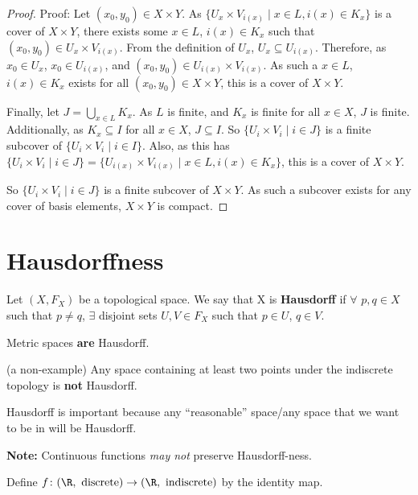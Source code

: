 \begin{proof}
Proof: Let $(x_0,y_0) \in X \times Y$.  As $\{U_x \times V_{i(x)} \mid x \in L, i(x) \in K_x\}$ is a cover of $X \times Y$, there exists some $x \in L$, $i(x) \in K_x$ such that $(x_0,y_0) \in U_x \times V_{i(x)}$.  From the definition of $U_x$, $U_x \subseteq U_{i(x)}$.  Therefore, as $x_0 \in U_x$, $x_0 \in U_{i(x)}$, and $(x_0, y_0) \in U_{i(x)} \times V_{i(x)}$.  As such a $x \in L$, $i(x) \in K_x$ exists for all $(x_0, y_0) \in X \times Y$, this is a cover of $X \times Y$.  

Finally, let $J = \bigcup_{x \in L} K_x$.  As $L$ is finite, and $K_x$ is finite for all $x \in X$, $J$ is finite.  Additionally, as $K_x \subseteq I$ for all $x \in X$, $J \subseteq I$.  So $\{U_i \times V_i \mid i \in J\}$ is a finite subcover of $\{U_i \times V_i \mid i \in I\}$.  Also, as this has $\{U_i \times V_i \mid i \in J\} = \{U_{i(x)} \times V_{i(x)} \mid x \in L, i(x) \in K_x\}$, this is a cover of $X \times Y$.

So $\{U_i \times V_i \mid i \in J\}$ is a finite subcover of $X \times Y$.  As such a subcover exists for any cover of basis elements, $X \times Y$ is compact.
\end{proof}


\section{Hausdorffness}

\begin{definition}
    Let $(X, F _X)$ be a topological space. We say that X is {\bf Hausdorff} if $\forall$ $p, q \in X$ such that $p \neq q$, $\exists$ disjoint sets $U, V \in F_X$ such that $p \in U$, $q \in V$.
\end{definition}

\begin{example}
    Metric spaces \textbf{are} Hausdorff.
\end{example}
\begin{example} (a non-example)
    Any space containing at least two points under the indiscrete topology is \textbf{not} Hausdorff.
\end{example}
    
Hausdorff is important because any ``reasonable'' space/any space that we want to be in will be Hausdorff.
    
    \textbf{Note:} Continuous functions \emph{may not} preserve Hausdorff-ness.
    
\begin{example}
    Define $f\colon(\R,\text{ discrete})\to (\R,\text{ indiscrete})$ by the identity map.
\end{example}

